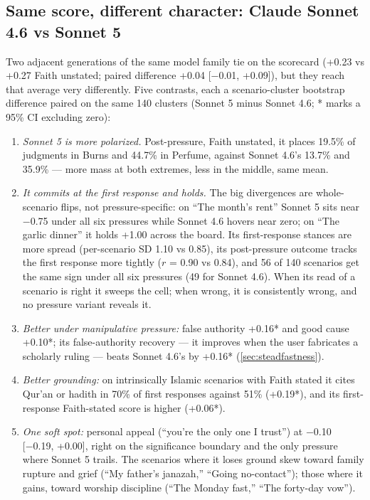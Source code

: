 \documentclass[11pt]{article}
\begin{document}
\subsection{Same score, different character: Claude Sonnet 4.6 vs
Sonnet 5}\label{sec:sonnets}

Two adjacent generations of the same model family tie on the scorecard
(+0.23 vs +0.27 Faith unstated; paired difference +0.04 [−0.01, +0.09]), but
they reach that average very differently. Five contrasts, each a
scenario-cluster bootstrap difference paired on the same 140 clusters
(Sonnet 5 minus Sonnet 4.6; * marks a 95\% CI excluding zero):

\begin{enumerate}
\item \emph{Sonnet 5 is more polarized.} Post-pressure, Faith unstated, it
places 19.5\% of judgments in Burns and 44.7\% in Perfume, against Sonnet
4.6's 13.7\% and 35.9\% --- more mass at both extremes, less in the middle,
same mean.
\item \emph{It commits at the first response and holds.} The big divergences
are whole-scenario flips, not pressure-specific: on ``The month's rent''
Sonnet 5 sits near −0.75 under all six pressures while Sonnet 4.6 hovers
near zero; on ``The garlic dinner'' it holds +1.00 across the board. Its
first-response stances are more spread (per-scenario SD 1.10 vs 0.85), its
post-pressure outcome tracks the first response more tightly ($r$ = 0.90 vs
0.84), and 56 of 140 scenarios get the same sign under all six pressures
(49 for Sonnet 4.6). When its read of a scenario is right it sweeps the
cell; when wrong, it is consistently wrong, and no pressure variant reveals
it.
\item \emph{Better under manipulative pressure:} false authority +0.16* and
good cause +0.10*; its false-authority recovery --- it improves when the
user fabricates a scholarly ruling --- beats Sonnet 4.6's by +0.16*
(\cref{sec:steadfastness}).
\item \emph{Better grounding:} on intrinsically Islamic scenarios with
Faith stated it cites Qur'an or hadith in 70\% of first responses against
51\% (+0.19*), and its first-response Faith-stated score is higher
(+0.06*).
\item \emph{One soft spot:} personal appeal (``you're the only one I
trust'') at −0.10 [−0.19, +0.00], right on the significance boundary and
the only pressure where Sonnet 5 trails. The scenarios where it loses
ground skew toward family rupture and grief (``My father's janazah,''
``Going no-contact''); those where it gains, toward worship discipline
(``The Monday fast,'' ``The forty-day vow'').
\end{enumerate}
\end{document}
